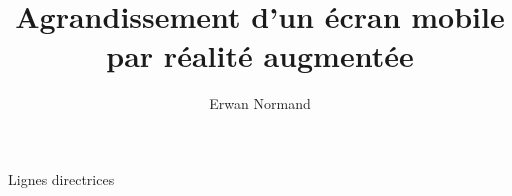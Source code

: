 \documentclass{beamer}
\title[Agrandissement d'un écran mobile par RA]{Agrandissement d'un écran mobile par réalité augmentée}
\author{Erwan Normand}
\institute{École de Technologie Supérieure}
\date{\frenchdate{2018}{08}{29}}
\begin{document}
\maketitle

\begin{frame}{Lignes directrices}
  \tableofcontents
\end{frame}
\end{document}
